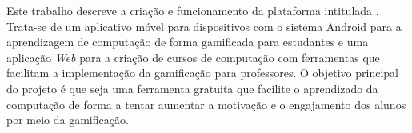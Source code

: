 Este trabalho descreve a criação e funcionamento da plataforma intitulada \appName. Trata-se de um aplicativo móvel para dispositivos com o sistema Android para a aprendizagem de computação de forma gamificada para estudantes e uma aplicação \textit{Web} para a criação de cursos de computação com ferramentas que facilitam a implementação da gamificação para professores. O objetivo principal do projeto é que seja uma ferramenta gratuita que facilite o aprendizado da computação de forma a tentar aumentar a motivação e o engajamento dos alunos por meio da gamificação.